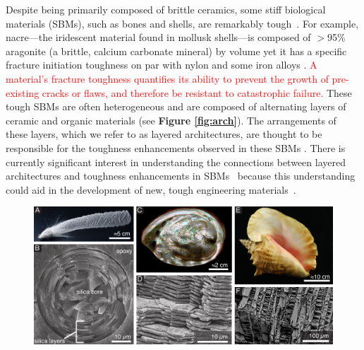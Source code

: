 \documentclass[12pt,onecolumn]{article}
\begin{document}
\linenumbers
\begin{bibunit}
\doublespacing
Despite being primarily composed of brittle ceramics, some stiff biological materials (SBMs), such as bones and shells, are remarkably tough~\cite{ritchie2011conflicts, wegst2015bioinspired, wang2001, gao2017mass}. For example, nacre---the iridescent material found in mollusk shells---is composed of $>$95\% aragonite (a brittle, calcium carbonate mineral) by volume yet it has a specific fracture initiation toughness on par with nylon and some iron alloys \cite{gao2017mass}. \textcolor{red}{A material's fracture toughness quantifies its ability to prevent the growth of pre-existing cracks or flaws, and therefore be resistant to catastrophic failure.} These tough SBMs are often heterogeneous and are composed of alternating layers of ceramic and organic materials (see {\bf Figure \ref{fig:arch}}). The arrangements of these layers, which we refer to as layered architectures, are thought to be responsible for the toughness enhancements observed in these SBMs \cite{mayer2011new}. There is currently significant interest in understanding the connections between layered architectures and toughness enhancements in SBMs~\cite{mayer2011new,mayer2005rigid,rabiei2010failure, kolednik2011bioinspired} because this understanding could aid in the development of new, tough engineering materials~\cite{munch2008tough,karambelas2013strombus,gao2017mass}.
%
			\begin{figure}[ht!]
			\centering
			\includegraphics[width=\textwidth]{../Figures/FigureArchEx/Figure1_V3.pdf}

\end{figure}
\end{bibunit}
\end{document}
